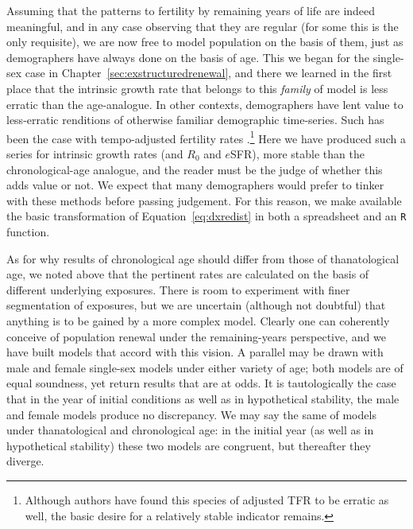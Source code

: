 Assuming that the patterns to fertility by remaining years of life
are indeed meaningful, and in any case observing that they are regular (for
some this is the only requisite), we are now free to model population on the
basis of them, just as demographers have always done on the basis of age. This we began
for the single-sex case in Chapter~\ref{sec:exstructuredrenewal}, and there we
learned in the first place that the intrinsic growth rate that belongs to this
\textit{family} of model is less erratic than the age-analogue. In other
contexts, demographers have lent value to less-erratic renditions of otherwise
familiar demographic time-series. Such has been the case with tempo-adjusted
fertility rates \citep{bongaarts1998quantum}.\footnote{Although authors
\citep[e.g.,][]{kim2000quantum} have found this species of adjusted TFR to be
erratic as well, the basic desire for a relatively stable indicator remains.}
Here we have produced such a series for intrinsic growth rates (and $R_0$ and $e$SFR), 
more stable than the chronological-age analogue, and the reader must be the 
judge of whether this adds value or not. We expect that many demographers would
prefer to tinker with these methods before passing judgement. For this reason,
we make available the basic transformation of Equation~\eqref{eq:dxredist} in both a spreadsheet and
an \texttt{R} function.

As for why results of chronological age should differ from those of
thanatological age, we noted above that the pertinent rates are calculated on
the basis of different underlying exposures. There is room to experiment with
 finer segmentation of exposures, but we are uncertain (although not doubtful)
 that anything is to be gained by a more complex model. Clearly one can
coherently conceive of population renewal under the remaining-years
perspective, and we have built models that accord with this vision. A parallel
may be drawn with male and female single-sex models under either variety of
age; both models are of equal soundness, yet return results that are at odds. 
It is tautologically the case that in the year of initial conditions as well as
in hypothetical stability, the male and female models produce no discrepancy. We
may say the same of models under thanatological and chronological age: in the
initial year (as well as in hypothetical stability) these two models are congruent, but thereafter they
diverge.

